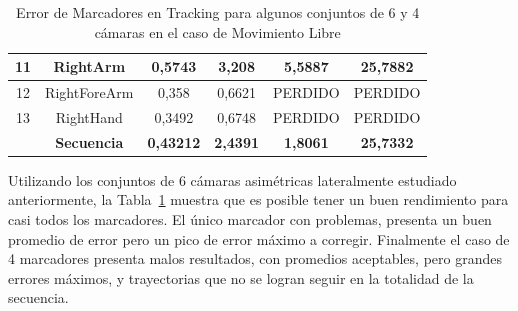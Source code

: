 \begin{table}[h]
\begin{tabular}{c|c|c|c|c|c|}
\multicolumn{1}{|c|}{11} & RightArm & 0,5743 & 3,208 & 5,5887 & 25,7882 \\ \hline
\multicolumn{1}{|c|}{12} & RightForeArm & 0,358 & 0,6621 & PERDIDO & PERDIDO \\ \hline
\multicolumn{1}{|c|}{13} & RightHand & 0,3492 & 0,6748 & PERDIDO & PERDIDO \\ \hline
 & \textbf{Secuencia} & \textbf{0,43212} & \textbf{2,4391} & \textbf{1,8061} & \textbf{25,7332} \\ \cline{2-6} 
\end{tabular}
\caption{Error de Marcadores en Tracking para algunos conjuntos de 6 y 4 cámaras en el caso de Movimiento Libre}
\label{error_captura_libre_6_4}
\end{table}

Utilizando los conjuntos de 6 cámaras asimétricas lateralmente estudiado anteriormente, la Tabla~\ref{error_captura_libre_6_4} muestra que es posible tener un buen rendimiento para casi todos los marcadores. El único marcador con problemas, presenta un buen promedio de error pero un pico de error máximo a corregir. Finalmente el caso de 4 marcadores presenta malos resultados, con promedios aceptables, pero grandes errores máximos, y trayectorias que no se logran seguir en la totalidad de la secuencia.




